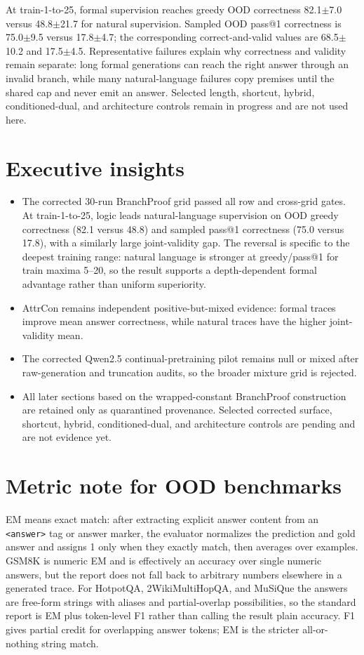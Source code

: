\documentclass[10pt]{article}
\begin{document}
At train-1-to-25, formal supervision reaches greedy OOD correctness
82.1$\pm$7.0
versus 48.8$\pm$21.7
for natural supervision. Sampled OOD pass@1 correctness is
75.0$\pm$9.5 versus
17.8$\pm$4.7; the corresponding
correct-and-valid values are 68.5$\pm$10.2
and 17.5$\pm$4.5.
Representative failures explain why correctness and validity remain separate: long formal
generations can reach the right answer through an invalid branch, while many natural-language
failures copy premises until the shared cap and never emit an answer. Selected length, shortcut,
hybrid, conditioned-dual, and architecture controls remain in progress and are not used here.


\section{Executive insights}
\begin{itemize}
\item The corrected 30-run BranchProof grid passed all row and cross-grid gates. At train-1-to-25, logic leads natural-language supervision on OOD greedy correctness (82.1 versus 48.8) and sampled pass@1 correctness (75.0 versus 17.8), with a similarly large joint-validity gap. The reversal is specific to the deepest training range: natural language is stronger at greedy/pass@1 for train maxima 5--20, so the result supports a depth-dependent formal advantage rather than uniform superiority.
\item AttrCon remains independent positive-but-mixed evidence: formal traces improve mean answer correctness, while natural traces have the higher joint-validity mean.
\item The corrected Qwen2.5 continual-pretraining pilot remains null or mixed after raw-generation and truncation audits, so the broader mixture grid is rejected.
\item All later sections based on the wrapped-constant BranchProof construction are retained only as quarantined provenance. Selected corrected surface, shortcut, hybrid, conditioned-dual, and architecture controls are pending and are not evidence yet.
\end{itemize}

\section{Metric note for OOD benchmarks}
EM means exact match: after extracting explicit answer content from an \texttt{<answer>} tag or answer marker, the evaluator normalizes the prediction and gold answer and assigns 1 only when they exactly match, then averages over examples. GSM8K is numeric EM and is effectively an accuracy over single numeric answers, but the report does not fall back to arbitrary numbers elsewhere in a generated trace. For HotpotQA, 2WikiMultiHopQA, and MuSiQue the answers are free-form strings with aliases and partial-overlap possibilities, so the standard report is EM plus token-level F1 rather than calling the result plain accuracy. F1 gives partial credit for overlapping answer tokens; EM is the stricter all-or-nothing string match.
\end{document}
